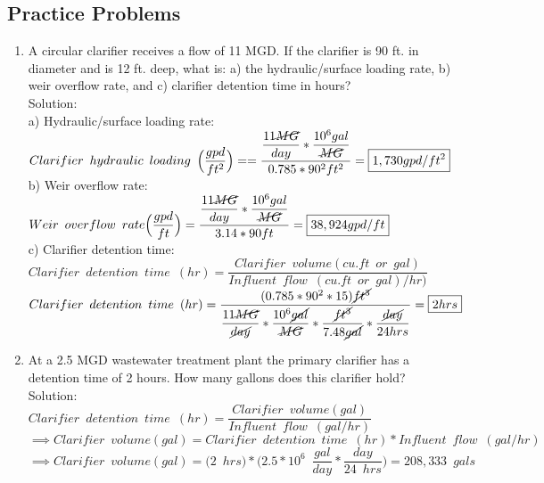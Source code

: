 \documentclass{article}
\begin{document}
\subsection{Practice Problems} 

\begin{enumerate}


\item A circular clarifier receives a flow of 11 MGD.  If the clarifier is 90 ft. in diameter and is 12 ft. deep, what is: a) the hydraulic/surface loading rate, b) weir overflow rate, and c) clarifier detention time in hours?\\
Solution:\\
a) Hydraulic/surface loading rate:\\
$Clarifier \enspace hydraulic \enspace loading \enspace 	\Big(\dfrac{gpd}{ft^2}\Big) ==\dfrac{\dfrac{11\cancel{MG}}{{day}}*\dfrac{10^6gal}{\cancel{MG}}}{0.785*90^2 ft^2}=\boxed{1,730gpd/ft^2}$\\
b) Weir overflow rate:\\ 
$Weir \enspace overflow \enspace rate \Big(\dfrac{gpd}{ft}\Big) =\dfrac{\dfrac{11\cancel{MG}}{{day}}*\dfrac{10^6gal}{\cancel{MG}}}{3.14*90 ft}=\boxed{38,924gpd/ft}$\\
c) Clarifier detention time:\\
$Clarifier \enspace detention \enspace time \enspace (hr) = 	\dfrac{ Clarifier \enspace volume (cu.ft \enspace or \enspace gal)}{Influent \enspace flow \enspace (cu.ft \enspace or \enspace gal)/hr)}$\\
$Clarifier \enspace detention \enspace time \enspace (hr) = 	\dfrac{(0.785*90^2*15)\cancel{ft^3}}{\dfrac{11\cancel{MG}}{\cancel{day}}*\dfrac{10^6\cancel{gal}}{\cancel{MG}}*\dfrac{\cancel{ft^3}}{7.48\cancel{gal}}*\dfrac{\cancel{day}}{24hrs}}=\boxed{2hrs}$\\

\item At a 2.5 MGD wastewater treatment plant the primary clarifier has a detention time of 2 hours. How many gallons does this clarifier hold?\\

Solution:\\
\vspace{0.2cm}
$Clarifier \enspace detention \enspace time \enspace (hr) = 	\dfrac{ Clarifier \enspace volume (gal)}{Influent \enspace flow \enspace (gal/hr)}$\\
\vspace{0.2cm}
$ \implies Clarifier \enspace volume (gal)=Clarifier \enspace detention \enspace time \enspace (hr)*Influent \enspace flow \enspace (gal/hr)$\\
\vspace{0.2cm}
$ \implies Clarifier \enspace volume (gal)= \Big(2 \enspace hrs\Big)*\Big(2.5*10^6 \enspace \dfrac{gal}{day}*\dfrac{day}{24 \enspace hrs}\Big)=\boxed{208,333 \enspace gals}$\\

\end{enumerate}
\end{document}
